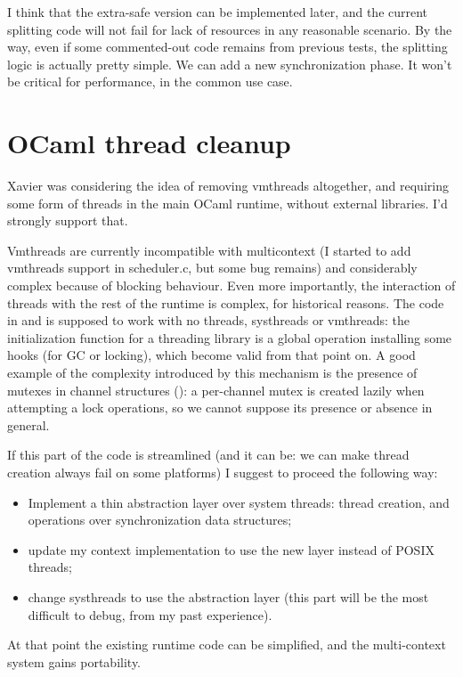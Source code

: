 \documentclass[a4paper,twoside,12pt]{article}
\begin{document}
I think that the extra-safe version can be implemented later, and the
current splitting code will not fail for lack of resources in any
reasonable scenario.
By the way, even if some commented-out code remains from previous
tests, the splitting logic is actually pretty simple.  We can add a
new synchronization phase.  It won't be critical for performance, in
the common use case.

\section{OCaml thread cleanup}
Xavier was considering the idea of removing vmthreads altogether, and
requiring some form of threads in the main OCaml runtime, without
external libraries.  I'd strongly support that.

Vmthreads are currently incompatible with multicontext (I started to
add vmthreads support in scheduler.c, but some bug remains) and
considerably complex because of blocking behaviour.  Even more
importantly, the interaction of threads with the rest of the runtime
is complex, for historical reasons.  The code in  and
 is supposed to work with no threads, systhreads or
vmthreads: the initialization function for a threading library is a
global operation installing some hooks (for GC or locking), which
become valid from that point on.  A good example of the complexity
introduced by this mechanism is the presence of mutexes in channel
structures (): a per-channel mutex is created
lazily when attempting a lock operations, so we cannot suppose its
presence or absence in general.

If this part of the code is streamlined (and it can be: we can make
thread creation always fail on some platforms) I suggest to proceed
the following way:

\begin{itemize}
\item Implement a thin abstraction layer over system threads: thread
  creation, and operations over synchronization data structures;
\item update my context implementation to use the new layer instead of
  POSIX threads;
\item change systhreads to use the abstraction layer (this part will
  be the most difficult to debug, from my past experience).
\end{itemize}

At that point the existing runtime code can be simplified, and the
multi-context system gains portability.
\end{document}
